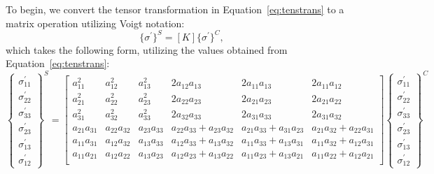 \documentclass[preprint,3p,times,sort&compress,letterpaper,12pt]{elsarticle} %
\begin{document}
To begin, we convert the tensor transformation in Equation~\ref{eq:tenstrans} to a matrix operation utilizing Voigt notation:
\begin{equation}
    \{\sigma^\prime\}^S = \left[K\right]\{\sigma^\prime\}^C ,
\end{equation}
which takes the following form, utilizing the values obtained from Equation~\ref{eq:tenstrans}:
\footnotesize
\begin{equation}
    \begin{Bmatrix}
        \sigma_{11}^\prime \\
        \sigma_{22}^\prime \\
        \sigma_{33}^\prime \\
        \sigma_{23}^\prime \\
        \sigma_{13}^\prime \\
        \sigma_{12}^\prime
    \end{Bmatrix}^S
    = 
    \begin{bmatrix}
        a_{11}^2 & a_{12}^2 & a_{13}^2 & 2a_{12}a_{13} & 2a_{11}a_{13} & 2a_{11}a_{12} \\
        a_{21}^2 & a_{22}^2 & a_{23}^2 & 2a_{22}a_{23} & 2a_{21}a_{23}& 2a_{21}a_{22}  \\
        a_{31}^2 & a_{32}^2 & a_{33}^2 & 2a_{32}a_{33} & 2a_{31}a_{33}& 2a_{31}a_{32}  \\
        a_{21}a_{31} & a_{22}a_{32} & a_{23}a_{33} & a_{22}a_{33}+a_{23}a_{32} & a_{21}a_{33}+a_{31}a_{23} & a_{21}a_{32}+a_{22}a_{31} \\
        a_{11}a_{31} & a_{12}a_{32} & a_{13}a_{33} & a_{12}a_{33}+a_{13}a_{32} & a_{11}a_{33}+a_{13}a_{31} & a_{11}a_{32}+a_{12}a_{31} \\
        a_{11}a_{21} & a_{12}a_{22} & a_{13}a_{23} & a_{12}a_{23}+a_{13}a_{22} & a_{11}a_{23}+a_{13}a_{21} & a_{11}a_{22}+a_{12}a_{21} \\
    \end{bmatrix}
    \begin{Bmatrix}
        \sigma^\prime_{11} \\
        \sigma^\prime_{22} \\
        \sigma^\prime_{33} \\
        \sigma^\prime_{23} \\
        \sigma^\prime_{13} \\
        \sigma^\prime_{12} 
    \end{Bmatrix}^C
\end{equation}
\normalsize
\end{document}
